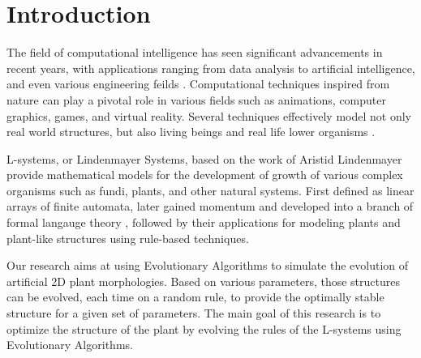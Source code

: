 \section{Introduction}
The field of computational intelligence has seen significant advancements in recent years, with applications ranging from data analysis to artificial intelligence, and even various engineering feilds \cite{ethan}\cite{slowik2020evolutionary}. Computational techniques inspired from nature can play a pivotal role in various fields such as animations, computer graphics, games, and virtual reality. Several techniques effectively model not only real world structures, but also living beings and real life lower organisms \cite{dawkins}\cite{oppenheimer}\cite{sims}.

L-systems, or Lindenmayer Systems, based on the work of Aristid Lindenmayer \cite{LINDENMAYER1968280} provide mathematical models for the development of growth of various complex organisms such as fundi, plants, and other natural systems. First defined as linear arrays of finite automata, later gained momentum and developed into a branch of formal langauge theory \cite{rozenberg1980mathematical}, followed by their applications for modeling plants and plant-like structures using rule-based techniques\cite{radomir}.

Our research aims at using Evolutionary Algorithms to simulate the evolution of artificial 2D plant morphologies. Based on various parameters, those structures can be evolved, each time on a random rule, to provide the optimally stable structure for a given set of parameters. The main goal of this research is to optimize the structure of the plant by evolving the rules of the L-systems using Evolutionary Algorithms. 